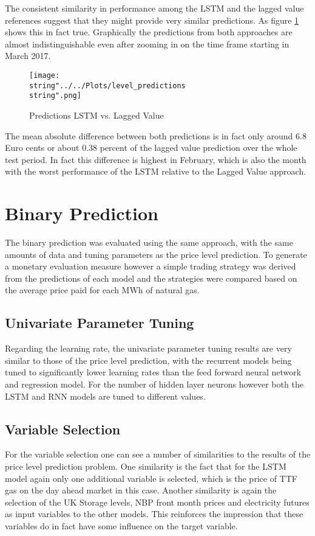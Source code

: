The consistent similarity in performance among the LSTM and the lagged value references suggest that they might provide very similar  predictions. As figure \ref{fig:level_predictions} shows this in fact true. Graphically the predictions from both approaches are almost indistinguishable even after zooming in on the time frame starting in March 2017.

\begin{figure}[h!]
  \centering
\texttt{[image: \\string"../../Plots/level\_predictions\\string".png]}
  \caption{Predictions LSTM vs. Lagged Value }\label{fig:level_predictions}
\end{figure}

The mean absolute difference between both predictions is in fact only around $6.8$ Euro cents or about $0.38$ percent of the lagged value prediction over the whole test period. In fact this difference is highest in February, which is also the month with the worst performance of the LSTM relative to the Lagged Value approach. 
\FloatBarrier
\section{Binary Prediction}
The binary prediction was evaluated using the same approach, with the same amounts of data and tuning parameters as the price level prediction. To generate a monetary evaluation measure however a simple trading strategy was derived from the predictions of each model and the strategies were compared based on the average price paid for each MWh of natural gas.
\subsection{Univariate Parameter Tuning}
Regarding the learning rate, the univariate parameter tuning results are very similar to those of the price level prediction, with the recurrent models being tuned to significantly lower learning rates than the feed forward neural network and regression model. For the number of hidden layer neurons however both the LSTM and RNN models are tuned to different values.

\subsection{Variable Selection}
For the variable selection one can see a number of similarities to the results of the price level prediction problem. One similarity is the fact that for the LSTM model again only one additional variable is selected, which is the price of TTF gas on the day ahead market in this case. Another similarity is again the selection of the UK Storage levels, NBP front month prices and electricity futures as input variables to the other models. This reinforces the impression that these variables do in fact have some influence on the target variable.

